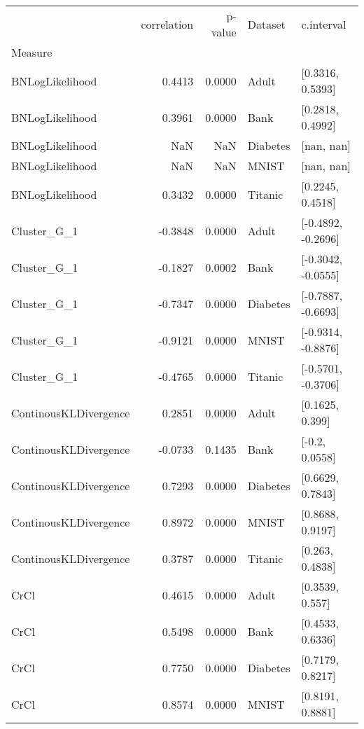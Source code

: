 \begin{tabular}{lrrll}
\toprule
{} &  correlation &  p-value &   Dataset &          c.interval \\
Measure               &              &          &           &                     \\
\midrule
BNLogLikelihood       &       0.4413 &   0.0000 &     Adult &    [0.3316, 0.5393] \\
BNLogLikelihood       &       0.3961 &   0.0000 &      Bank &    [0.2818, 0.4992] \\
BNLogLikelihood       &          NaN &      NaN &  Diabetes &          [nan, nan] \\
BNLogLikelihood       &          NaN &      NaN &     MNIST &          [nan, nan] \\
BNLogLikelihood       &       0.3432 &   0.0000 &   Titanic &    [0.2245, 0.4518] \\
Cluster\_G\_1         &      -0.3848 &   0.0000 &     Adult &  [-0.4892, -0.2696] \\
Cluster\_G\_1         &      -0.1827 &   0.0002 &      Bank &  [-0.3042, -0.0555] \\
Cluster\_G\_1         &      -0.7347 &   0.0000 &  Diabetes &  [-0.7887, -0.6693] \\
Cluster\_G\_1         &      -0.9121 &   0.0000 &     MNIST &  [-0.9314, -0.8876] \\
Cluster\_G\_1         &      -0.4765 &   0.0000 &   Titanic &  [-0.5701, -0.3706] \\
ContinousKLDivergence &       0.2851 &   0.0000 &     Adult &     [0.1625, 0.399] \\
ContinousKLDivergence &      -0.0733 &   0.1435 &      Bank &      [-0.2, 0.0558] \\
ContinousKLDivergence &       0.7293 &   0.0000 &  Diabetes &    [0.6629, 0.7843] \\
ContinousKLDivergence &       0.8972 &   0.0000 &     MNIST &    [0.8688, 0.9197] \\
ContinousKLDivergence &       0.3787 &   0.0000 &   Titanic &     [0.263, 0.4838] \\
CrCl                  &       0.4615 &   0.0000 &     Adult &     [0.3539, 0.557] \\
CrCl                  &       0.5498 &   0.0000 &      Bank &    [0.4533, 0.6336] \\
CrCl                  &       0.7750 &   0.0000 &  Diabetes &    [0.7179, 0.8217] \\
CrCl                  &       0.8574 &   0.0000 &     MNIST &    [0.8191, 0.8881] \\

\end{tabular}
